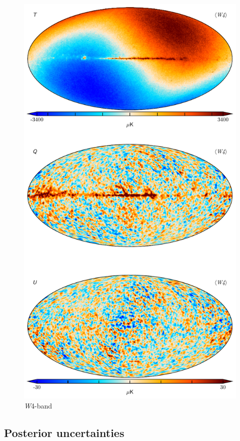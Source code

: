 \documentclass[twocolumn]{../../common/aa}
\newcommand{\W}[0]{\textit W}
\begin{document}
\begin{figure}
	\centering
	\includegraphics[height=0.9\textheight]{figures/090-WMAP_W4_map.pdf}
	\caption{\W4-band}
\end{figure}


\subsection{Posterior uncertainties}
\end{document}
